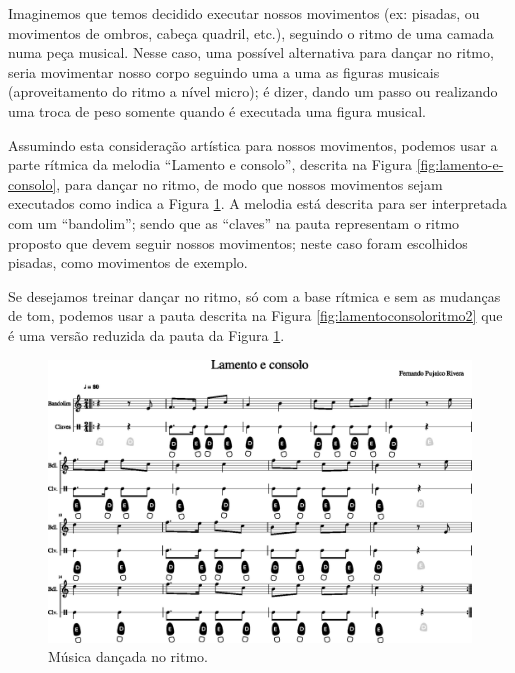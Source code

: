 \begin{example}
\label{ex:dancaritmo1}
Imaginemos que temos decidido executar nossos movimentos (ex: pisadas, ou movimentos de ombros, cabeça quadril, etc.),
seguindo o ritmo de uma camada numa peça musical.
Nesse caso, uma possível alternativa para dançar no ritmo, 
seria movimentar nosso corpo seguindo uma a uma as figuras musicais (aproveitamento do ritmo a nível micro);
é dizer, dando um passo ou realizando uma troca de peso somente quando é executada uma figura musical.

Assumindo esta  consideração artística para nossos movimentos, 
podemos usar a parte rítmica da melodia ``Lamento e consolo'', descrita na Figura \ref{fig:lamento-e-consolo},
para dançar no ritmo, 
de modo que nossos movimentos sejam executados como indica a Figura \ref{fig:lamentoconsoloritmo1}.
A melodia está descrita para ser interpretada com um ``bandolim'';
sendo que as ``claves'' na pauta representam o ritmo proposto que devem seguir nossos movimentos;
neste caso foram escolhidos pisadas, como movimentos de exemplo.

Se desejamos treinar dançar no ritmo, só com a base rítmica e sem as mudanças de tom,  
podemos usar a pauta descrita na Figura \ref{fig:lamentoconsoloritmo2} que é uma versão 
reduzida da pauta da Figura \ref{fig:lamentoconsoloritmo1}.

\end{example}
\begin{figure}
    \centering
    \includegraphics[width=\textwidth]{chapters/cap-musicalidade-tecnica/lamento-e-consolo-clave-ritmo-1.eps}
    \caption{Música dançada no ritmo.}
    \label{fig:lamentoconsoloritmo1}
\end{figure}


